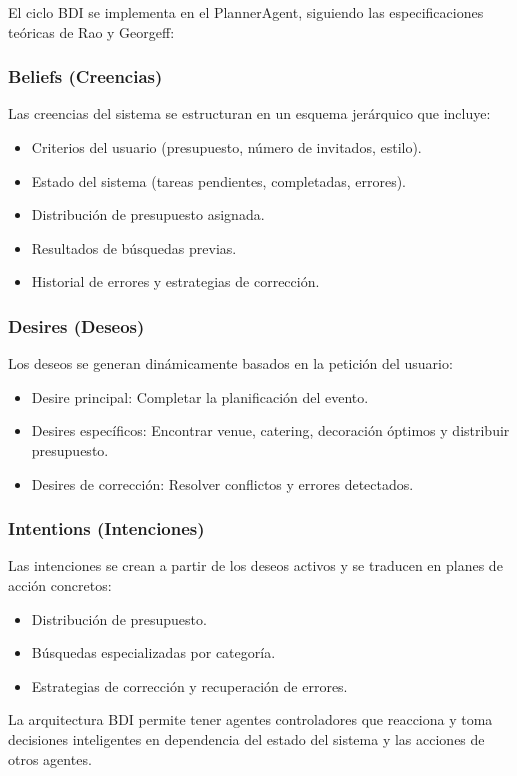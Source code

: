 \documentclass[runningheads,a4paper]{llncs}
\begin{document}
El ciclo BDI se implementa en el PlannerAgent, siguiendo las especificaciones teóricas de Rao y Georgeff:

\subsubsection{Beliefs (Creencias)}
Las creencias del sistema se estructuran en un esquema jerárquico que incluye:
\begin{itemize}
    \item Criterios del usuario (presupuesto, número de invitados, estilo).
    \item Estado del sistema (tareas pendientes, completadas, errores).
    \item Distribución de presupuesto asignada.
    \item Resultados de búsquedas previas.
    \item Historial de errores y estrategias de corrección.
\end{itemize}

\subsubsection{Desires (Deseos)}
Los deseos se generan dinámicamente basados en la petición del usuario:
\begin{itemize}
    \item Desire principal: Completar la planificación del evento.
    \item Desires específicos: Encontrar venue, catering, decoración óptimos y distribuir presupuesto.
    \item Desires de corrección: Resolver conflictos y errores detectados.
\end{itemize}

\subsubsection{Intentions (Intenciones)}
Las intenciones se crean a partir de los deseos activos y se traducen en planes de acción concretos:
\begin{itemize}
    \item Distribución de presupuesto.
    \item Búsquedas especializadas por categoría.
    \item Estrategias de corrección y recuperación de errores.
\end{itemize}

La arquitectura BDI permite tener agentes controladores que reacciona y toma decisiones inteligentes en dependencia del 
estado del sistema y las acciones de otros agentes.
\end{document}
